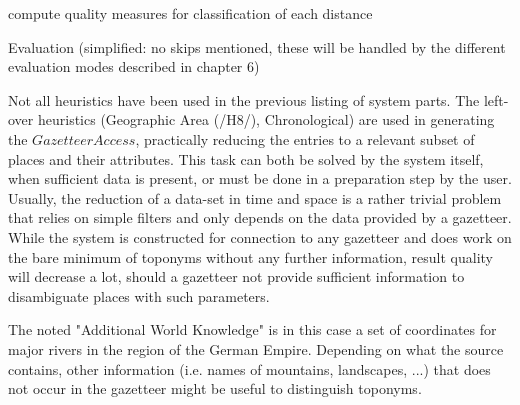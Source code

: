 \documentclass[11pt]{article}
\begin{document}
\begin{algorithm}[H]

 
compute quality measures for classification of each distance\;
\caption{Evaluation (simplified: no skips mentioned, these will be handled by the different evaluation modes described in chapter 6)}
\label{algo:eval}
\end{algorithm}

\newpage

Not all heuristics have been used in the previous listing of system parts. The left-over heuristics (Geographic Area (/H8/), Chronological) are used in generating the $Gazetteer Access$, practically reducing the entries to a relevant subset of places and their attributes. This task can both be solved by the system itself, when sufficient data is present, or must be done in a preparation step by the user. Usually, the reduction of a data-set in time and space is a rather trivial problem that relies on simple filters and only depends on the data provided by a gazetteer. While the system is constructed for connection to any gazetteer and does work on the bare minimum of toponyms without any further information, result quality will decrease a lot, should a gazetteer not provide sufficient information to disambiguate places with such parameters.

The noted "Additional World Knowledge" is in this case a set of coordinates for major rivers in the region of the German Empire. Depending on what the source contains, other information (i.e. names of mountains, landscapes, ...) that does not occur in the gazetteer might be useful to distinguish toponyms.\\
\end{document}
